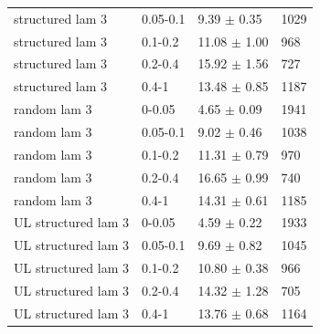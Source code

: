 \begin{tabular}{llll}
structured lam 3 & 0.05-0.1 & 9.39 $\pm$ 0.35 & 1029 \\
structured lam 3 & 0.1-0.2 & 11.08 $\pm$ 1.00 & 968 \\
structured lam 3 & 0.2-0.4 & 15.92 $\pm$ 1.56 & 727 \\
structured lam 3 & 0.4-1 & 13.48 $\pm$ 0.85 & 1187 \\
random lam 3 & 0-0.05 & 4.65 $\pm$ 0.09 & 1941 \\
random lam 3 & 0.05-0.1 & 9.02 $\pm$ 0.46 & 1038 \\
random lam 3 & 0.1-0.2 & 11.31 $\pm$ 0.79 & 970 \\
random lam 3 & 0.2-0.4 & 16.65 $\pm$ 0.99 & 740 \\
random lam 3 & 0.4-1 & 14.31 $\pm$ 0.61 & 1185 \\
UL structured lam 3 & 0-0.05 & 4.59 $\pm$ 0.22 & 1933 \\
UL structured lam 3 & 0.05-0.1 & 9.69 $\pm$ 0.82 & 1045 \\
UL structured lam 3 & 0.1-0.2 & 10.80 $\pm$ 0.38 & 966 \\
UL structured lam 3 & 0.2-0.4 & 14.32 $\pm$ 1.28 & 705 \\
UL structured lam 3 & 0.4-1 & 13.76 $\pm$ 0.68 & 1164 \\
\hline
\end{tabular}
